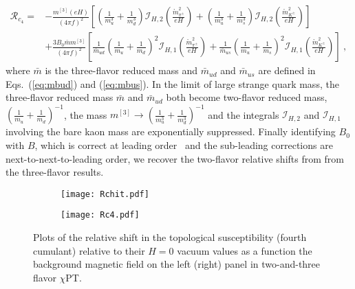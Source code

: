 \documentclass[12pt]{elsarticle}
\begin{document}
\begin{equation}
\begin{split}
\label{eq:Rc4} 
\mathcal{R}_{c_{4}}=&-\frac{m^{[3]}(eH)}{(4\pi f)^{2}}\left[\left(\frac{1}{m_{u}^{3}}+\frac{1}{m_{d}^{3}}\right)\mathcal{I}_{H,2}(\tfrac{\mathring{m}_{\pi^{\pm}}^{2}}{eH})+\left(\frac{1}{m_{u}^{3}}+\frac{1}{m_{s}^{3}}\right)\mathcal{I}_{H,2}(\tfrac{\mathring{m}_{K^{\pm}}^{2}}{eH})\right]\\
&+\frac{3B_{0}\bar{m}m^{[3]}}{(4\pi f)^{2}}\left[\frac{1}{\bar{m}_{ud}}\left(\frac{1}{m_{u}}+\frac{1}{m_{d}}\right)^{2}\mathcal{I}_{H,1}(\tfrac{\mathring{m}_{\pi^{\pm}}^{2}}{eH})+\frac{1}{\bar{m}_{us}}\left(\frac{1}{m_{u}}+\frac{1}{m_{s}}\right)^{2}\mathcal{I}_{H,1}(\tfrac{\mathring{m}_{K^{\pm}}^{2}}{eH})\right]\ ,
\end{split}
\end{equation}
where $\bar{m}$ is the three-flavor reduced mass and $\bar{m}_{ud}$ and $\bar{m}_{us}$ are defined in Eqs.~(\ref{eq:mbud}) and (\ref{eq:mbus}). In the limit of large strange quark mass, the three-flavor reduced mass $\bar{m}$ and $\bar{m}_{ud}$ both become two-flavor reduced mass, $(\frac{1}{m_{u}}+\frac{1}{m_{d}})^{-1}$, the mass $m^{[3]}\rightarrow(\frac{1}{m_{u}^{3}}+\frac{1}{m_{d}^{3}})^{-1}$ and the integrals $\mathcal{I}_{H,2}$ and $\mathcal{I}_{H,1}$ involving the bare kaon mass are exponentially suppressed. Finally identifying $B_{0}$ with $B$, which is correct at leading order~\cite{Gasser:1984gg} and the sub-leading corrections are next-to-next-to-leading order, we recover the two-flavor relative shifts from \cite{Adhikari:2021xra} from the three-flavor results.
\begin{figure}
	\centering
	\begin{subfigure}[b]{0.48\textwidth}
	\texttt{[image: Rchit.pdf]}
	\end{subfigure}
	\begin{subfigure}[b]{0.48\textwidth}
	\texttt{[image: Rc4.pdf]}
	\end{subfigure}
\caption{Plots of the relative shift in the topological susceptibility (fourth cumulant) relative to their $H=0$ vacuum values as a function the background magnetic field on the left (right) panel in two-and-three flavor $\chi$PT.}
	\label{fig:rchitc4}
\end{figure}
\end{document}
